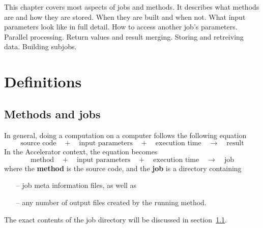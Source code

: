 

This chapter covers most aspects of jobs and methods.  It describes
what methods are and how they are stored.  When they are built and
when not.  What input parameters look like in full detail.  How to
access another job's parameters.  Parallel processing.  Return values
and result merging.  Storing and retreiving data.  Building subjobs.



\section{Definitions}

\subsection{Methods and jobs}

In general, doing a computation on a computer follows the following equation
\[
  \text{source code} \quad+\quad \text{input parameters} \quad+\quad \text{execution time} \quad\rightarrow\quad \text{result}
\]
In the Accelerator context, the equation becomes
\[
  \text{method} \quad+\quad \text{input parameters} \quad+\quad \text{execution time} \quad\rightarrow\quad \text{job}
\]
where the \textbf{method} is the source code, and the \textbf{job} is
a directory containing
\begin{itemize}
\item[--] job meta information files,  as well as
\item[--] any number of output files created by the running method.
\end{itemize}
The exact contents of the job directory will be discussed in section~\ref{}.

